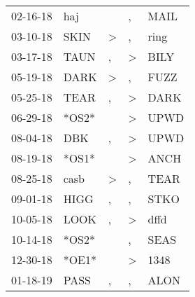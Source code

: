 \begin{supertabular}{p{0.07\textwidth}p{0.06\textwidth}p{0.02\textwidth}p{0.02\textwidth}p{0.06\textwidth}}
          02-16-18\textsuperscript{} &            haj\textsuperscript{} &                  &                , &           MAIL\textsuperscript{} \\
          03-10-18\textsuperscript{} &           SKIN\textsuperscript{} &     \textgreater &                , &           ring\textsuperscript{} \\
          03-17-18\textsuperscript{} &           TAUN\textsuperscript{} &                , &     \textgreater &           BILY\textsuperscript{} \\
          05-19-18\textsuperscript{} &           DARK\textsuperscript{} &     \textgreater &                , &           FUZZ\textsuperscript{} \\
          05-25-18\textsuperscript{} &           TEAR\textsuperscript{} &                , &     \textgreater &           DARK\textsuperscript{} \\
          06-29-18\textsuperscript{} &                            *OS2* &                  &     \textgreater &           UPWD\textsuperscript{} \\
          08-04-18\textsuperscript{} &            DBK\textsuperscript{} &                , &     \textgreater &           UPWD\textsuperscript{} \\
          08-19-18\textsuperscript{} &                            *OS1* &                  &     \textgreater &           ANCH\textsuperscript{} \\
          08-25-18\textsuperscript{} &           casb\textsuperscript{} &     \textgreater &                , &           TEAR\textsuperscript{} \\
          09-01-18\textsuperscript{} &           HIGG\textsuperscript{} &                , &                , &           STKO\textsuperscript{} \\
          10-05-18\textsuperscript{} &           LOOK\textsuperscript{} &                , &     \textgreater &           dffd\textsuperscript{} \\
          10-14-18\textsuperscript{} &                            *OS2* &                  &                , &           SEAS\textsuperscript{} \\
          12-30-18\textsuperscript{} &                            *OE1* &                  &     \textgreater &           1348\textsuperscript{} \\
          01-18-19\textsuperscript{} &           PASS\textsuperscript{} &                , &                , &           ALON\textsuperscript{} \\

\end{supertabular}
